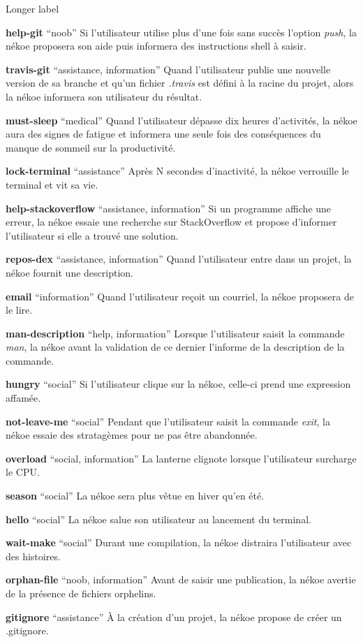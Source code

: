\documentclass{report}
\begin{document}
\begin{labeling}{Longer label\quad}
    \item[\textbf{help-git} \enquote{noob}] Si l'utilisateur utilise plus d'une fois sans succès l'option \textit{push}, la nékoe proposera son aide puis informera des instructions shell à saisir.
	\item[\textbf{travis-git} \enquote{assistance, information}] Quand l'utilisateur publie une nouvelle version de sa branche et qu'un fichier \textit{.travis} est défini à la racine du projet, alors la nékoe informera son utilisateur du résultat.
    \item[\textbf{must-sleep} \enquote{medical}] Quand l'utilisateur dépasse dix heures d'activités, la nékoe aura des signes de fatigue et informera une seule fois des conséquences du manque de sommeil sur la productivité.
    \item[\textbf{lock-terminal} \enquote{assistance}] Après N secondes d'inactivité, la nékoe verrouille le terminal et vit sa vie.
	\item[\textbf{help-stackoverflow} \enquote{assistance, information}] Si un programme affiche une erreur, la nékoe essaie une recherche sur StackOverflow et propose d'informer l'utilisateur si elle a trouvé une solution.
	\item[\textbf{repos-dex} \enquote{assistance, information}] Quand l'utilisateur entre dans un projet, la nékoe fournit une description.
	\item[\textbf{email} \enquote{information}] Quand l'utilisateur reçoit un courriel, la nékoe proposera de le lire.
	\item[\textbf{man-description} \enquote{help, information}] Lorsque l'utilisateur saisit la commande \textit{man}, la nékoe avant la validation de ce dernier l'informe de la description de la commande.
	\item[\textbf{hungry} \enquote{social}] Si l'utilisateur clique sur la nékoe, celle-ci prend une expression affamée.
	\item[\textbf{not-leave-me} \enquote{social}] Pendant que l'utilisateur saisit la commande \textit{exit}, la nékoe essaie des stratagèmes pour ne pas être abandonnée.
	\item[\textbf{overload} \enquote{social, information}] La lanterne clignote lorsque l'utilisateur surcharge le CPU.
	\item[\textbf{season} \enquote{social}] La nékoe sera plus vêtue en hiver qu'en été.
	\item[\textbf{hello} \enquote{social}] La nékoe salue son utilisateur au lancement du terminal.
	\item[\textbf{wait-make} \enquote{social}] Durant une compilation, la nékoe distraira l'utilisateur avec des histoires.
	\item[\textbf{orphan-file} \enquote{noob, information}] Avant de saisir une publication, la nékoe avertie de la présence de fichiers orphelins.
	\item[\textbf{gitignore} \enquote{assistance}] À la création d'un projet, la nékoe propose de créer un .gitignore.
\end{labeling}
\end{document}
